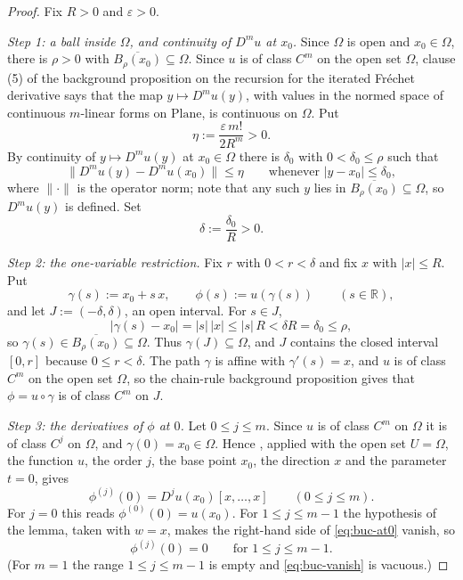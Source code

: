 \begin{proof}
Fix $R>0$ and $\varepsilon>0$.

\medskip\noindent\emph{Step 1: a ball inside $\Omega$, and continuity of $D^{m}u$ at $x_0$.}
Since $\Omega$ is open and $x_0\in\Omega$, there is $\rho>0$ with
$\overline{B_\rho(x_0)}\subseteq\Omega$.  Since $u$ is of class $C^{m}$ on the open set
$\Omega$, clause (5) of the background proposition on the recursion for the iterated Fr\'echet
derivative says that the map $y\mapsto D^{m}u(y)$, with values in the normed space of
continuous $m$-linear forms on $\mathrm{Plane}$, is continuous on $\Omega$.  Put
\[
  \eta:=\frac{\varepsilon\,m!}{2R^{m}}>0 .
\]
By continuity of $y\mapsto D^{m}u(y)$ at $x_0\in\Omega$ there is $\delta_0$ with
$0<\delta_0\le\rho$ such that
\begin{equation}\label{eq:buc-cont}
  \bigl\lVert D^{m}u(y)-D^{m}u(x_0)\bigr\rVert\le\eta
  \qquad\text{whenever }\lvert y-x_0\rvert\le\delta_0 ,
\end{equation}
where $\lVert\cdot\rVert$ is the operator norm; note that any such $y$ lies in
$\overline{B_\rho(x_0)}\subseteq\Omega$, so $D^{m}u(y)$ is defined.  Set
\[
  \delta:=\frac{\delta_0}{R}>0 .
\]

\medskip\noindent\emph{Step 2: the one-variable restriction.}
Fix $r$ with $0<r<\delta$ and fix $x$ with $\lvert x\rvert\le R$.  Put
\[
  \gamma(s):=x_0+s\,x,\qquad \phi(s):=u(\gamma(s))\qquad(s\in\mathbb{R}),
\]
and let $J:=(-\delta,\delta)$, an open interval.  For $s\in J$,
\[
  \lvert\gamma(s)-x_0\rvert=\lvert s\rvert\,\lvert x\rvert\le\lvert s\rvert\,R<\delta R=\delta_0\le\rho ,
\]
so $\gamma(s)\in\overline{B_\rho(x_0)}\subseteq\Omega$.  Thus $\gamma(J)\subseteq\Omega$, and
$J$ contains the closed interval $[0,r]$ because $0\le r<\delta$.  The path $\gamma$ is affine
with $\gamma'(s)=x$, and $u$ is of class $C^{m}$ on the open set $\Omega$, so the chain-rule
background proposition gives that $\phi=u\circ\gamma$ is of class $C^{m}$ on $J$.

\medskip\noindent\emph{Step 3: the derivatives of $\phi$ at $0$.}
Let $0\le j\le m$.  Since $u$ is of class $C^{m}$ on $\Omega$ it is of class $C^{j}$ on
$\Omega$, and $\gamma(0)=x_0\in\Omega$.  Hence , applied with
the open set $U=\Omega$, the function $u$, the order $j$, the base point $x_0$, the direction
$x$ and the parameter $t=0$, gives
\begin{equation}\label{eq:buc-at0}
  \phi^{(j)}(0)=D^{j}u(x_0)[x,\ldots,x]\qquad(0\le j\le m).
\end{equation}
For $j=0$ this reads $\phi^{(0)}(0)=u(x_0)$.  For $1\le j\le m-1$ the hypothesis of the lemma,
taken with $w=x$, makes the right-hand side of \eqref{eq:buc-at0} vanish, so
\begin{equation}\label{eq:buc-vanish}
  \phi^{(j)}(0)=0\qquad\text{for }1\le j\le m-1 .
\end{equation}
(For $m=1$ the range $1\le j\le m-1$ is empty and \eqref{eq:buc-vanish} is vacuous.)


\end{proof}

